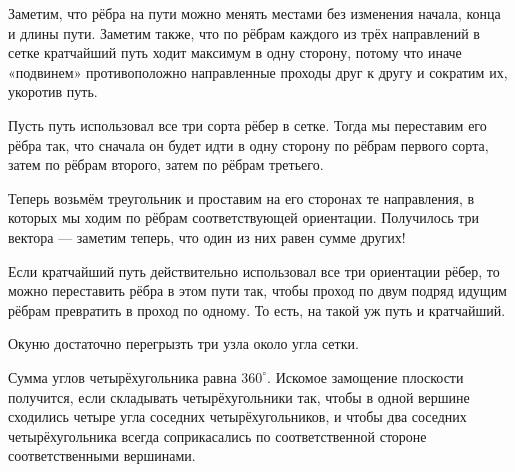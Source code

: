 \begin{itemize}

\itA Заметим, что рёбра на пути можно менять местами без изменения начала, конца и длины пути. Заметим также, что по рёбрам каждого из трёх направлений в сетке кратчайший путь ходит максимум в одну сторону, потому что иначе «подвинем» противоположно направленные проходы друг к другу и сократим их, укоротив путь.

Пусть путь использовал все три сорта рёбер в сетке. Тогда мы переставим его рёбра так, что сначала он будет идти в одну сторону по рёбрам первого сорта, затем по рёбрам второго, затем по рёбрам третьего.

Теперь возьмём треугольник и проставим на его сторонах те направления, в которых мы ходим по рёбрам соответствующей ориентации. Получилось три вектора — заметим теперь, что один из них равен сумме других!

Если кратчайший путь действительно использовал все три ориентации рёбер, то можно переставить рёбра в этом пути так, чтобы проход по двум подряд идущим рёбрам превратить в проход по одному. То есть, на такой уж путь и кратчайший.

\itB Окуню достаточно перегрызть три узла около угла сетки.

\itC Сумма углов четырёхугольника равна $360^\circ$. Искомое замощение плоскости получится, если складывать четырёхугольники так, чтобы в одной вершине сходились четыре угла соседних четырёхугольников, и чтобы два соседних четырёхугольника всегда соприкасались по соответственной стороне соответственными вершинами.
\end{itemize}